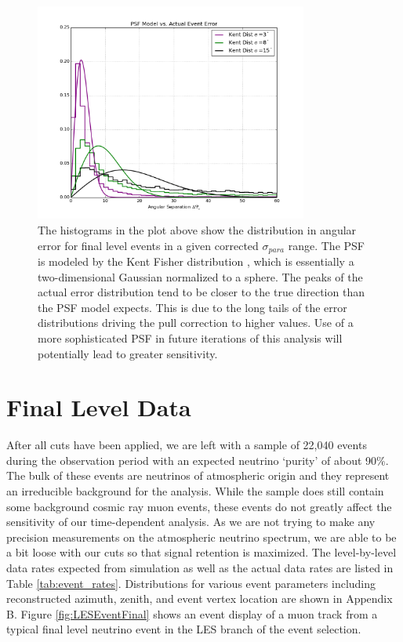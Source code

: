 \documentclass{gatech-thesis}
\begin{document}
\begin{figure}[ht]
  \begin{center}
    \includegraphics[width=0.8\textwidth,keepaspectratio]{CorrectSigmaVsKentDistribution_Multi_Nu.png}
  \end{center}
  \caption{The histograms in the plot above show the distribution in angular error for final level events in a given corrected $\sigma_{para}$ range. The PSF is modeled by the Kent Fisher distribution \cite{1982}, which is essentially a two-dimensional Gaussian normalized to a sphere. The peaks of the actual error distribution tend to be closer to the true direction than the PSF model expects. This is due to the long tails of the error distributions driving the pull correction to higher values. Use of a more sophisticated PSF in future iterations of this analysis will potentially lead to greater sensitivity.}
  \label{fig:PSFModel}
\end{figure}

\section{Final Level Data}
After all cuts have been applied, we are left with a sample of 22,040 events during the observation period with an expected neutrino `purity' of about 90$\%$. The bulk of these events are neutrinos of atmospheric origin and they represent an irreducible background for the analysis. While the sample does still contain some background cosmic ray muon events, these events do not greatly affect the sensitivity of our time-dependent analysis. As we are not trying to make any precision measurements on the atmospheric neutrino spectrum, we are able to be a bit loose with our cuts so that signal retention is maximized. The level-by-level data rates expected from simulation as well as the actual data rates are listed in Table \ref{tab:event_rates}. Distributions for various event parameters including reconstructed azimuth, zenith, and event vertex location are shown in Appendix B. Figure \ref{fig:LESEventFinal} shows an event display of a muon track from a typical final level neutrino event in the LES branch of the event selection. 
\end{document}
